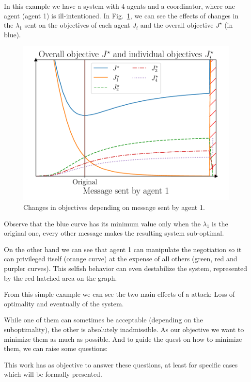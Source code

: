 \documentclass[../main.tex]{subfiles}
\begin{document}
\begin{example}
In this example we have a system with $4$ agents and a coordinator, where one agent (agent 1) is ill-intentioned. In Fig.~\ref{fig:change_in_j}, we can see the effects of changes in the $\lambda_{1}$ sent on the objectives of each agent $J_{i}$ and the overall objective $J^{\star}$ (in blue).
  \begin{figure}[H]
    \centering
    \includegraphics[width=.55\textwidth]{../img/qualitative_example.pdf}
    \caption{Changes in objectives depending on message sent by agent 1.}\label{fig:change_in_j}
  \end{figure}
  Observe that the blue curve has its minimum value only when the $\lambda_{1}$ is the original one, every other message makes the resulting system sub-optimal.

  On the other hand we can see that agent 1 can manipulate the negotiation so it can privileged itself (orange curve) at the expense of all others (green, red and purpler curves). This selfish behavior can even destabilize the system, represented by the red hatched area on the graph.
\end{example}

From this simple example we can see the two main effects of a attack: Loss of optimality and eventually  of the system.

While one of them can sometimes be acceptable (depending on the suboptimality), the other is absolutely inadmissible. As our objective we want to minimize them as much as possible.
And to guide the quest on how to minimize them, we can raise some questions:

This work has as objective to answer these questions, at least for specific cases which will be formally presented.
\end{document}
